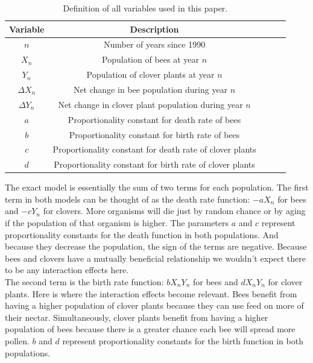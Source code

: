 \documentclass[12pt,a4paper,titlepage]{report}
\begin{document}
		\begin{table}[ht]
			\centering
			\begin{tabular}{ccccc}
				\toprule
				Variable & Description \\ 
				\midrule 
				\(n\) & Number of years since 1990 \\ 
				\(X_{n}\) & Population of bees at year \(n\) \\
				\(Y_{n}\) & Population of clover plants at year \(n\) \\ 
				\(\Delta X_{n}\) & Net change in bee population during year \(n\) \\
				\(\Delta Y_{n}\) & Net change in clover plant population during year \(n\)   \\ 
				\(a\) & Proportionality constant for death rate of bees \\ 
				\(b\) & Proportionality constant for birth rate of bees  \\ 
				\(c\) & Proportionality constant for death rate of clover plants  \\ 
				\(d\) & Proportionality constant for birth rate of clover plants  \\ 
				\bottomrule
			\end{tabular}
			\caption{Definition of all variables used in this paper.}
		\end{table}
		The exact model is essentially the sum of two terms for each population. The first term in both models can be thought of as the death rate function: \(-aX_{n}\) for bees and \(-cY_{n}\) for clovers. More organisms will die just by random chance or by aging if the population of that organism is higher. The parameters \(a\) and \(c\) represent proportionality constants for the death function in both populations. And because they decrease the population, the sign of the terms are negative. Because bees and clovers have a mutually beneficial relationship we wouldn't expect there to be any interaction effects here. \\
		
		The second term is the birth rate function: \(bX_{n}Y_{n}\) for bees and \(dX_{n}Y_{n}\) for clover plants. Here is where the interaction effects become relevant. Bees benefit from having a higher population of clover plants because they can use feed on more of their nectar. Simultaneously, clover plants benefit from having a higher population of bees because there is a greater chance each bee will spread more pollen. \(b\) and \(d\) represent proportionality constants for the birth function in both populations. \\
		
\end{document}
